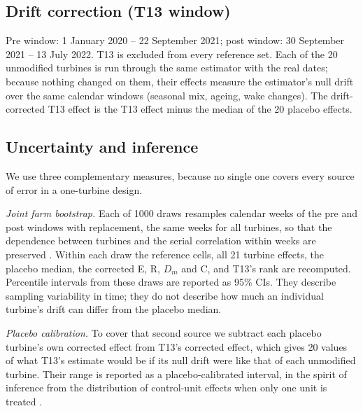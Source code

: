 \documentclass[preprint,12pt]{elsarticle}
\begin{document}
\subsection{Drift correction (T13 window)}

Pre window: 1 January 2020 -- 22 September 2021; post window: 30 September 2021 -- 13 July 2022. T13 is excluded from every reference set. Each of the 20 unmodified turbines is run through the same estimator with the real dates; because nothing changed on them, their effects measure the estimator's null drift over the same calendar windows (seasonal mix, ageing, wake changes). The drift-corrected T13 effect is the T13 effect minus the median of the 20 placebo effects.

\subsection{Uncertainty and inference}

We use three complementary measures, because no single one covers every source of error in a one-turbine design.

\emph{Joint farm bootstrap.} Each of 1000 draws resamples calendar weeks of the pre and post windows with replacement, the same weeks for all turbines, so that the dependence between turbines and the serial correlation within weeks are preserved \cite{kunsch89,bertrand04}. Within each draw the reference cells, all 21 turbine effects, the placebo median, the corrected E, R, \(D_{m}\) and C, and T13's rank are recomputed. Percentile intervals from these draws are reported as 95\% CIs. They describe sampling variability in time; they do not describe how much an individual turbine's drift can differ from the placebo median.

\emph{Placebo calibration.} To cover that second source we subtract each placebo turbine's own corrected effect from T13's corrected effect, which gives 20 values of what T13's estimate would be if its null drift were like that of each unmodified turbine. Their range is reported as a placebo-calibrated interval, in the spirit of inference from the distribution of control-unit effects when only one unit is treated \cite{conley11}.
\end{document}
